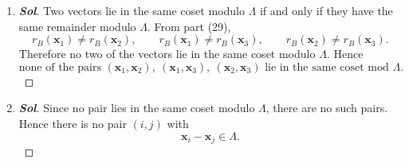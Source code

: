 \begin{enumerate}
\begin{proof}[\normalfont\color{magenta}\bfseries Sol]
\begin{itemize}
\[\begin{pmatrix}
			\frac85
		\end{pmatrix}
		=
		\begin{pmatrix}
			5\\[2pt]
			4\\[2pt]
			-1
		\end{pmatrix}.
		\]
		Also,
		\[
		\mathbf y_3
		=
		B
		\begin{pmatrix}
			3\\1\\-1
		\end{pmatrix},
		\]
		so \(\mathbf y_3\in\Lambda\).
	\end{itemize}
	Thus
	\[
	\boxed{
		\mathbf y_1=
		\begin{pmatrix}
			5\\3\\-2
		\end{pmatrix},
		\qquad
		\mathbf y_2=
		\begin{pmatrix}
			-1\\3\\1
		\end{pmatrix},
		\qquad
		\mathbf y_3=
		\begin{pmatrix}
			5\\4\\-1
		\end{pmatrix}.
	}
	\]
	\end{proof}
\item \begin{proof}[\normalfont\color{magenta}\bfseries Sol]
Two vectors lie in the same coset modulo \(\Lambda\) if and only if they have the same remainder modulo \(\Lambda\).
From part (29),
\[
r_B(\mathbf x_1)\neq r_B(\mathbf x_2),\qquad
r_B(\mathbf x_1)\neq r_B(\mathbf x_3),\qquad
r_B(\mathbf x_2)\neq r_B(\mathbf x_3).
\]
Therefore no two of the vectors lie in the same coset modulo \(\Lambda\).
Hence
\[
\boxed{\text{none of the pairs }(\mathbf x_1,\mathbf x_2),\ (\mathbf x_1,\mathbf x_3),\ (\mathbf x_2,\mathbf x_3)\text{ lie in the same coset mod }\Lambda.}
\]
\end{proof}
\item \begin{proof}[\normalfont\color{magenta}\bfseries Sol]
Since no pair lies in the same coset modulo \(\Lambda\), there are no such pairs. Hence there is no pair \((i,j)\) with
\[
\mathbf x_i-\mathbf x_j\in\Lambda.
\]


\end{proof}
\end{enumerate}
